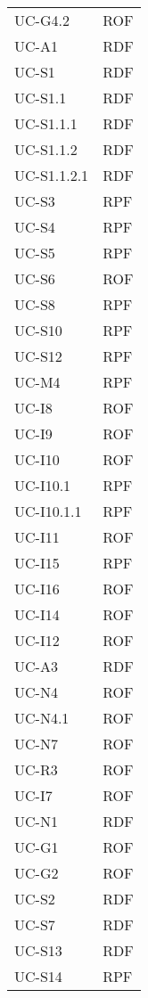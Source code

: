 \begin{longtable}{| p{5cm} | p{5cm} |}
		UC-G4.2 & ROF \\
		\rowcolor{LightGray}
		UC-A1 & RDF\\
		UC-S1 & RDF \\
		\rowcolor{LightGray}
		UC-S1.1 & RDF\\
		UC-S1.1.1 & RDF\\
		\rowcolor{LightGray}
		UC-S1.1.2 & RDF\\
		UC-S1.1.2.1 & RDF\\
		\rowcolor{LightGray}
		UC-S3 & RPF\\
		UC-S4 & RPF\\
		\rowcolor{LightGray}
		UC-S5 & RPF \\
		UC-S6 & ROF \\
		\rowcolor{LightGray}
		UC-S8 & RPF \\
		UC-S10 & RPF \\
		\rowcolor{LightGray}
		UC-S12 & RPF \\ 
		UC-M4 & RPF\\
		\rowcolor{LightGray}
		UC-I8 & ROF \\
		UC-I9 & ROF \\
		\rowcolor{LightGray}
		UC-I10 & ROF \\
		UC-I10.1 & RPF \\
		\rowcolor{LightGray}
		UC-I10.1.1 & RPF\\
		UC-I11 & ROF \\
		\rowcolor{LightGray}
		UC-I15 & RPF \\
		UC-I16 & ROF \\
		\rowcolor{LightGray}
		UC-I14 & ROF \\
		UC-I12 & ROF \\
		\rowcolor{LightGray}
		UC-A3 & RDF\\
		UC-N4 & ROF\\
		\rowcolor{LightGray}
		UC-N4.1 & ROF\\
		UC-N7 & ROF\\
		\rowcolor{LightGray}
		UC-R3 & ROF\\
		\rowcolor{LightGray}
		UC-I7 & ROF\\
		UC-N1 & RDF\\
		\rowcolor{LightGray}
		UC-G1 & ROF\\
		UC-G2 & ROF\\
		\rowcolor{LightGray}
		UC-S2 & RDF\\
		UC-S7 & RDF\\
		\rowcolor{LightGray}
		UC-S13 & RDF\\
		UC-S14 & RPF\\

\end{longtable}
